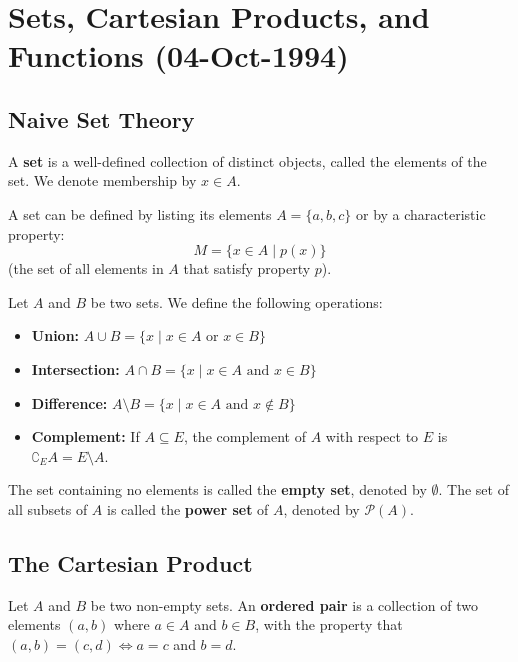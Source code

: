 \section{Sets, Cartesian Products, and Functions (04-Oct-1994)}

\subsection*{Naive Set Theory}

\begin{definition}
A \textbf{set} is a well-defined collection of distinct objects, called the elements of the set. We denote membership by $x \in A$.
\end{definition}

A set can be defined by listing its elements $A = \{a, b, c\}$ or by a characteristic property:
$$ M = \{x \in A \mid p(x)\} $$
(the set of all elements in $A$ that satisfy property $p$).

\begin{definition}\leavevmode
Let $A$ and $B$ be two sets. We define the following operations:
\begin{itemize}
    \item \textbf{Union:} $A \cup B = \{x \mid x \in A \text{ or } x \in B\}$
    \item \textbf{Intersection:} $A \cap B = \{x \mid x \in A \text{ and } x \in B\}$
    \item \textbf{Difference:} $A \setminus B = \{x \mid x \in A \text{ and } x \notin B\}$
    \item \textbf{Complement:} If $A \subseteq E$, the complement of $A$ with respect to $E$ is $\complement_E A = E \setminus A$.
\end{itemize}
\end{definition}

\begin{remark}
The set containing no elements is called the \textbf{empty set}, denoted by $\emptyset$. The set of all subsets of $A$ is called the \textbf{power set} of $A$, denoted by $\mathcal{P}(A)$.
\end{remark}

\subsection*{The Cartesian Product}

\begin{definition}
Let $A$ and $B$ be two non-empty sets. An \textbf{ordered pair} is a collection of two elements $(a, b)$ where $a \in A$ and $b \in B$, with the property that $(a, b) = (c, d) \iff a = c$ and $b = d$.
\end{definition}

